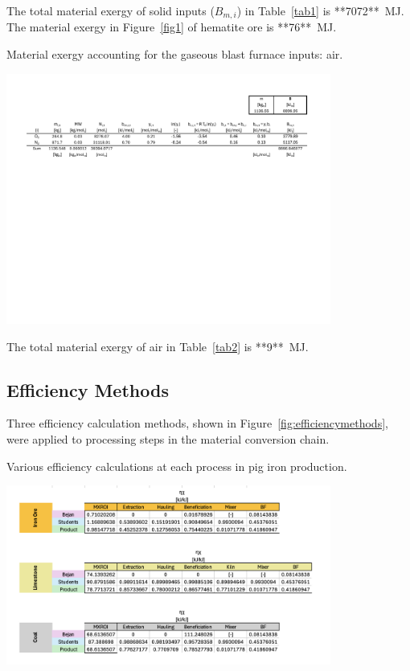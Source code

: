 \documentclass[energies,article,submit,pdftex,moreauthors]{Definitions/mdpi}
\begin{document}
The total material exergy of solid inputs ($B_{m,i}$)
in Table~\ref{tab1} is **7072**~MJ.
The material exergy in Figure~\ref{fig1}
of hematite ore is **76**~MJ.

\begin{table}
  \centering
  \caption{Material exergy accounting for the gaseous blast furnace inputs: air.}
  \label{fig:Gaseous Blast Furnace Inputs}
  \includegraphics[width=0.8\textwidth]{images/Air BF Inputs.pdf}

\end{table}

The total material exergy of air
in Table~\ref{tab2} is **9**~MJ.


\subsection{Efficiency Methods}
\label{ssec: efficiency methods}

Three efficiency calculation methods,
shown in Figure~\ref{fig:efficiencymethods},
were applied to processing steps
in the material conversion chain.

\begin{table}
  \centering
  \caption{Various efficiency calculations at each process in pig iron production.}
  \label{fig:Process Efficiencies for iron, limestone, and coal ore.}
  \includegraphics[width=0.8\textwidth]{images/efficiency_tables.pdf}

\end{table}
\end{document}
